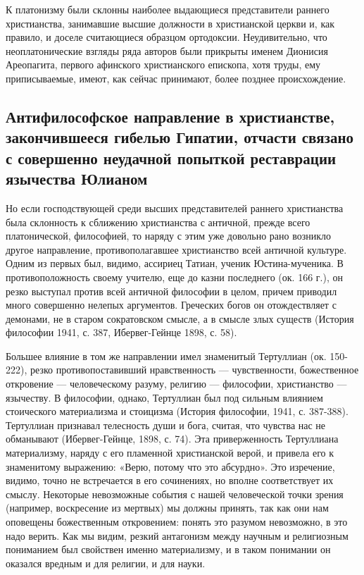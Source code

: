 К платонизму были склонны наиболее выдающиеся представители раннего
христианства, занимавшие высшие должности в христианской церкви и, как
правило, и доселе считающиеся образцом ортодоксии. Неудивительно, что
неоплатонические взгляды ряда авторов были прикрыты именем Дионисия
Ареопагита, первого афинского христианского епископа, хотя труды,
ему приписываемые, имеют, как сейчас принимают, более позднее
происхождение.

\subsection{Антифилософское направление в христианстве, закончившееся
гибелью Гипатии, отчасти связано с совершенно неудачной
попыткой реставрации язычества Юлианом}

Но если господствующей среди высших представителей раннего
христианства была склонность к сближению христианства с античной,
прежде всего платонической, философией, то наряду с этим уже довольно
рано возникло другое направление, противополагавшее христианство всей
античной культуре. Одним из первых был, видимо, ассириец Татиан,
ученик Юстина-мученика. В противоположность своему учителю, еще до
казни последнего (ок. 166 г.), он резко выступал против всей античной
философии в целом, причем приводил много совершенно нелепых
аргументов. Греческих богов он отождествляет с демонами, не в старом
сократовском смысле, а в смысле злых существ (История философии 1941,
с. 387, Ибервег-Гейнце 1898, с. 58).

Большее влияние в том же направлении имел знаменитый Тертуллиан (ок.
150-222), резко противопоставивший нравственность --- чувственности,
божественное откровение --- человеческому разуму, религию ---
философии, христианство --- язычеству. В философии, однако, Тертуллиан
был под сильным влиянием стоического материализма и стоицизма (История
философии, 1941, с. 387-388). Тертуллиан признавал телесность души и
бога, считая, что чувства нас не обманывают (Ибервег-Гейнце, 1898, с.
74). Эта приверженность Тертуллиана материализму, наряду с его
пламенной христианской верой, и привела его к знаменитому выражению:
«Верю, потому что это абсурдно». Это изречение, видимо, точно не
встречается в его сочинениях, но вполне соответствует их смыслу.
Некоторые невозможные события с нашей человеческой точки зрения
(например, воскресение из мертвых) мы должны принять, так как они нам
оповещены божественным откровением: понять это разумом невозможно, в
это надо верить. Как мы видим, резкий антагонизм между научным и
религиозным пониманием был свойствен именно материализму, и в таком
понимании он оказался вредным и для религии, и для науки.

